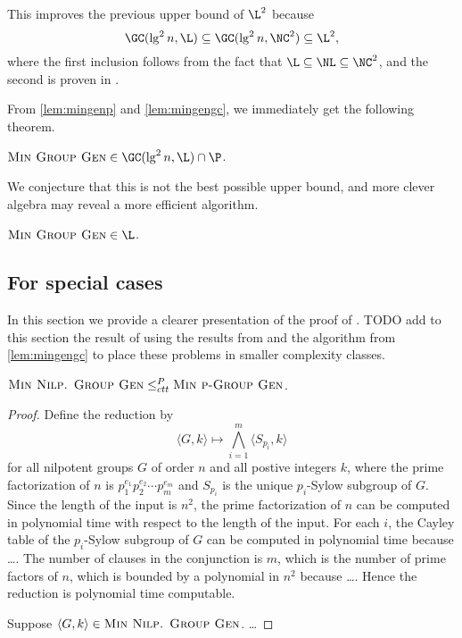 \documentclass{article}
\begin{document}
This improves the previous upper bound of $\L^2$ because
\begin{equation*}
  \GC(\lg^2 n, \L) \subseteq \GC(\lg^2 n, \NC^2) \subseteq \L^2,
\end{equation*}
where the first inclusion follows from the fact that $\L \subseteq \NL \subseteq \NC^2$, and the second is proven in \cite[Lemma~3.2.8]{wolf90}.

From \autoref{lem:mingenp} and \autoref{lem:mingengc}, we immediately get the following theorem.

\begin{theorem}
  $\textsc{Min Group Gen} \in \GC(\lg^2 n, \L) \cap \P$.
\end{theorem}

We conjecture that this is not the best possible upper bound, and more clever algebra may reveal a more efficient algorithm.

\begin{conjecture}
  $\textsc{Min Group Gen} \in \L$.
\end{conjecture}

\subsection{For special cases}

In this section we provide a clearer presentation of the proof of \cite[Theorem~7]{at06}.
TODO add to this section the result of using the results from \cite{bklm01} and the algorithm from \autoref{lem:mingengc} to place these problems in smaller complexity classes.

\begin{proposition}
  $\textsc{Min Nilp. Group Gen} \leq_{ctt}^P \textsc{Min p-Group Gen}$.
\end{proposition}
\begin{proof}
  Define the reduction by
  \begin{equation*}
    \langle G, k \rangle \mapsto \bigwedge_{i=1}^m \langle S_{p_i}, k \rangle
  \end{equation*}
  for all nilpotent groups $G$ of order $n$ and all postive integers $k$, where the prime factorization of $n$ is $p_1^{e_1}p_2^{e_2}\dotsb p_m^{e_m}$ and $S_{p_i}$ is the unique $p_i$-Sylow subgroup of $G$.
  Since the length of the input is $n^2$, the prime factorization of $n$ can be computed in polynomial time with respect to the length of the input.
  For each $i$, the Cayley table of the $p_i$-Sylow subgroup of $G$ can be computed in polynomial time because \ldots.
  The number of clauses in the conjunction is $m$, which is the number of prime factors of $n$, which is bounded by a polynomial in $n^2$ because \ldots.
  Hence the reduction is polynomial time computable.

  Suppose $\langle G, k \rangle \in \textsc{Min Nilp. Group Gen}$.
  \ldots
\end{proof}
\end{document}
